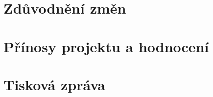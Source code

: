 \documentclass[a4paper,11pt]{article}
\begin{document}








\section{Zdůvodnění změn}






\section{Přínosy projektu a hodnocení}



\section{Tisková zpráva}
\end{document}
